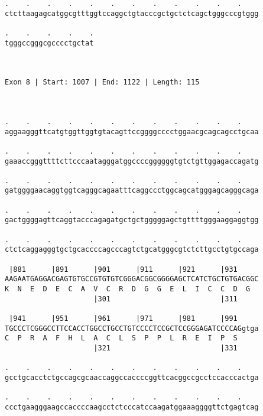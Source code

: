 \documentclass{article}
\begin{document}
\begin{Verbatim}
.    .    .    .    .    .    .    .    .    .    .    .    
ctcttaagagcatggcgtttggtccaggctgtacccgctgctctcagctgggcccgtggg
                                                            
.    .    .    .    .
tgggccgggcgcccctgctat
                     
                     
 
Exon 8 | Start: 1007 | End: 1122 | Length: 115



.    .    .    .    .    .    .    .    .    .    .    .    
aggaagggttcatgtggttggtgtacagttccggggcccctggaacgcagcagcctgcaa
                                                            
.    .    .    .    .    .    .    .    .    .    .    .    
gaaaccgggttttcttcccaatagggatggccccggggggtgtctgttggagaccagatg
                                                            
.    .    .    .    .    .    .    .    .    .    .    .    
gatggggaacaggtggtcagggcagaatttcaggccctggcagcatgggagcagggcaga
                                                            
.    .    .    .    .    .    .    .    .    .    .    .    
gactggggagttcaggtacccagagatgctgctgggggagctgttttgggaaggaggtgg
                                                            
.    .    .    .    .    .    .    .    .    .    .    .    
ctctcaggagggtgctgcaccccagcccagtctgcatgggcgtctcttgcctgtgccaga
                                                            
 |881      |891      |901      |911      |921      |931     
AAGAATGAGGACGAGTGTGCCGTGTGTCGGGACGGCGGGGAGCTCATCTGCTGTGACGGC
K  N  E  D  E  C  A  V  C  R  D  G  G  E  L  I  C  C  D  G  
                     |301                          |311     
  
 |941      |951      |961      |971      |981      |991     
TGCCCTCGGGCCTTCCACCTGGCCTGCCTGTCCCCTCCGCTCCGGGAGATCCCCAGgtga
C  P  R  A  F  H  L  A  C  L  S  P  P  L  R  E  I  P  S     
                     |321                          |331     
  
.    .    .    .    .    .    .    .    .    .    .    .    
gcctgcacctctgccagcgcaaccaggccaccccggttcacggccgcctccacccactga
                                                            
.    .    .    .    .    .    .    .    .    .    .    .    
ccctgaagggaagccaccccaagcctctcccatccaagatggaaaggggttctgagtcag
                                                            

\end{Verbatim}
\end{document}
